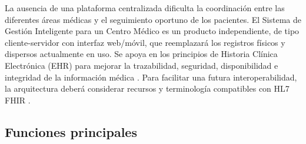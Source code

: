 \documentclass[11pt,a4paper]{article}
\begin{document}
	La ausencia de una plataforma centralizada dificulta la coordinación entre las diferentes áreas médicas y el seguimiento oportuno de los pacientes. El Sistema de Gestión Inteligente para un Centro Médico es un producto independiente, de tipo cliente-servidor con interfaz web/móvil, que reemplazará los registros físicos y dispersos actualmente en uso. Se apoya en los principios de Historia Clínica Electrónica (EHR) para mejorar la trazabilidad, seguridad, disponibilidad e integridad de la información médica \cite{hayrinen2008,menachemi2011,gagnon2012}. Para facilitar una futura interoperabilidad, la arquitectura deberá considerar recursos y terminología compatibles con HL7 FHIR \cite{hl7fhir}.
	
	\subsection{Funciones principales}
	
\end{document}
